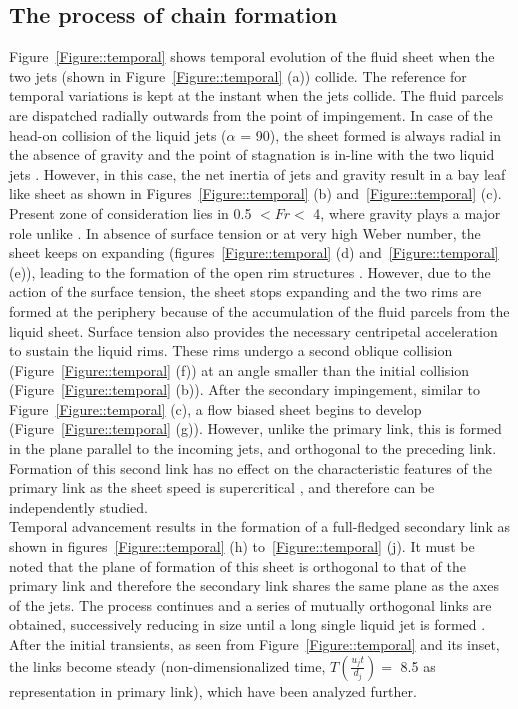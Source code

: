 \subsection{The process of chain formation}
Figure~\ref{Figure::temporal} shows temporal evolution of the fluid sheet when the two jets (shown in Figure~\ref{Figure::temporal} (a)) collide. The reference for temporal variations is kept at the instant when the jets collide. The fluid parcels are dispatched radially outwards from the point of impingement. In case of the head-on collision of the liquid jets ($\alpha$ = 90\degree), the sheet formed is always radial in the absence of gravity \citep{eggers2008physics} and the point of stagnation is in-line with the two liquid jets \citep{inamura2014effect}. However, in this case, the net inertia of jets and gravity result in a bay leaf like sheet as shown in Figures~\ref{Figure::temporal} (b) and~\ref{Figure::temporal} (c). Present zone of consideration lies in 0.5 $< Fr <$ 4, where gravity plays a major role unlike \citet{bush2004collision,bremond2006atomization}. In absence of surface tension or at very high Weber number, the sheet keeps on expanding (figures~\ref{Figure::temporal} (d) and~\ref{Figure::temporal} (e)), leading to the formation of the open rim structures \citep{taylor1960formation,chen2013high}. However, due to the action of the surface tension, the sheet stops expanding and the two rims are formed at the periphery because of the accumulation of the fluid parcels from the liquid sheet. Surface tension also provides the necessary centripetal acceleration to sustain the liquid rims. These rims undergo a second oblique collision (Figure~\ref{Figure::temporal} (f)) at an angle smaller than the initial collision (Figure~\ref{Figure::temporal} (b)). After the secondary impingement, similar to Figure~\ref{Figure::temporal} (c), a flow biased sheet begins to develop (Figure~\ref{Figure::temporal} (g)). However, unlike the primary link, this is formed in the plane parallel to the incoming jets, and orthogonal to the preceding link.  Formation of this second link has no effect on the characteristic features of the primary link as the sheet speed is supercritical \citep{bush2004collision}, and therefore can be independently studied.\\
Temporal advancement results in the formation of a full-fledged secondary link as shown in figures~\ref{Figure::temporal} (h) to~\ref{Figure::temporal} (j). It must be noted that the plane of formation of this sheet is orthogonal to that of the primary link and therefore the secondary link shares the same plane as the axes of the jets. The process continues and a series of mutually orthogonal links are obtained, successively reducing in size until a long single liquid jet is formed \citep{bush2004collision}. After the initial transients, as seen from Figure~\ref{Figure::temporal} and its inset, the links become steady (non-dimensionalized time, $T \left(\frac{u_jt}{d_j}\right) = $ 8.5 as representation in primary link), which have been analyzed further.
